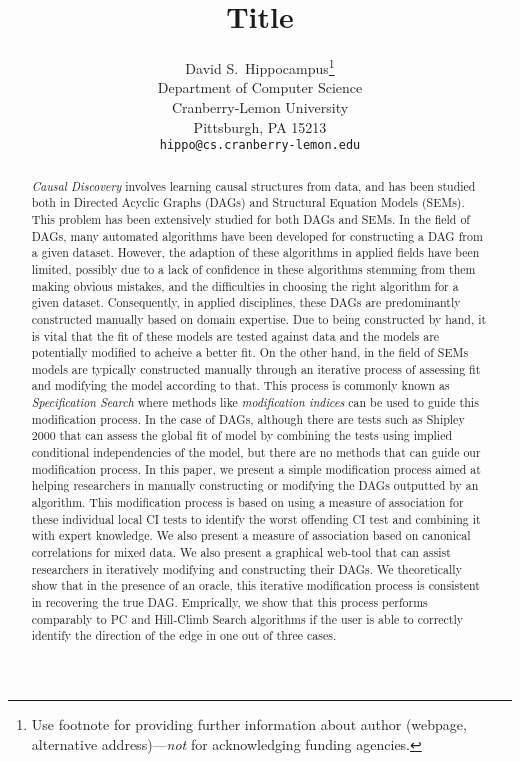 \documentclass{article}
\title{Title}
\author{%
  David S.~Hippocampus\thanks{Use footnote for providing further information
    about author (webpage, alternative address)---\emph{not} for acknowledging
    funding agencies.} \\
  Department of Computer Science\\
  Cranberry-Lemon University\\
  Pittsburgh, PA 15213 \\
  \texttt{hippo@cs.cranberry-lemon.edu} \\
}
\begin{document}
\maketitle

\begin{abstract}
	\emph{Causal Discovery} involves learning causal structures
	from data, and has been studied both in Directed Acyclic Graphs
	(DAGs) and Structural Equation Models (SEMs). This problem has been
	extensively studied for both DAGs and SEMs. In the field of DAGs, many
	automated algorithms have been developed for constructing a DAG from a
	given dataset. However, the adaption of these algorithms in applied
	fields have been limited, possibly due to a lack of confidence in these
	algorithms stemming from them making obvious mistakes, and the
	difficulties in choosing the right algorithm for a given dataset.
	Consequently, in applied disciplines, these DAGs are predominantly
	constructed manually based on domain expertise. Due to being
	constructed by hand, it is vital that the fit of these models are
	tested against data and the models are potentially modified to acheive
	a better fit. On the other hand, in the field of SEMs models are
	typically constructed manually through an iterative process of
	assessing fit and modifying the model according to that. This process
	is commonly known as \emph{Specification Search} where methods like
	\emph{modification indices} can be used to guide this modification
	process. In the case of DAGs, although there are tests such as Shipley
	2000 that can assess the global fit of model by combining the tests
	using implied conditional independencies of the model, but there are no
	methods that can guide our modification process. In this paper, we
	present a simple modification process aimed at helping researchers in
	manually constructing or modifying the DAGs outputted by an algorithm.
	This modification process is based on using a measure of association
	for these individual local CI tests to identify the worst offending CI
	test and combining it with expert knowledge. We also present a measure
	of association based on canonical correlations for mixed data. We also
	present a graphical web-tool that can assist researchers in iteratively
	modifying and constructing their DAGs. We theoretically show that in
	the presence of an oracle, this iterative modification process is
	consistent in recovering the true DAG. Emprically, we show that this
	process performs comparably to PC and Hill-Climb Search algorithms if
	the user is able to correctly identify the direction of the edge in one
	out of three cases.
\end{abstract}
\end{document}

